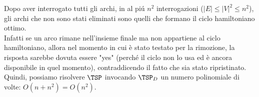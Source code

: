 Dopo aver interrogato tutti gli archi, in al piú $n^2$ interrogazioni ($|E| \leq |V|^2 \leq n^2$), 
gli archi che non sono stati eliminati sono quelli che formano il ciclo hamiltoniano ottimo. \\
Infatti se un arco rimane nell'insieme finale  ma non appartiene al ciclo hamiltoniano, 
allora nel momento in cui è stato testato per la rimozione, la risposta sarebbe dovuta essere "yes" 
(perché il ciclo non lo usa ed è ancora disponibile in quel momento), contraddicendo il fatto che 
sia stato ripristinato. \\

Quindi, possiamo risolvere $\TSP$ invocando $\TSP_D$ un numero polinomiale di volte: $O(n + n^2) = O(n^2)$.

